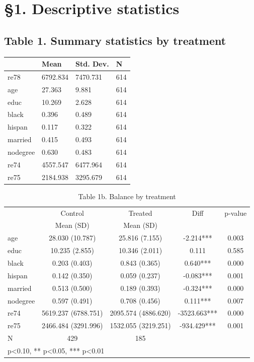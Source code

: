 \section{§1. Descriptive statistics}

\subsection*{Table 1. Summary statistics by treatment}
\begin{tabular}{llll}
\toprule
 & Mean & Std. Dev. & N \\
\midrule
re78 & 6792.834 & 7470.731 & 614 \\
age & 27.363 & 9.881 & 614 \\
educ & 10.269 & 2.628 & 614 \\
black & 0.396 & 0.489 & 614 \\
hispan & 0.117 & 0.322 & 614 \\
married & 0.415 & 0.493 & 614 \\
nodegree & 0.630 & 0.483 & 614 \\
re74 & 4557.547 & 6477.964 & 614 \\
re75 & 2184.938 & 3295.679 & 614 \\
\bottomrule
\end{tabular}


\begin{table}[htbp]
\centering
\caption{Table 1b. Balance by treatment}
\begin{tabular}{lcccc}
\hline\hline
 & Control & Treated & Diff & p-value \\
 & Mean (SD) & Mean (SD) & & \\
\hline
age & 28.030 (10.787) & 25.816 (7.155) & -2.214*** & 0.003 \\
educ & 10.235 (2.855) & 10.346 (2.011) & 0.111 & 0.585 \\
black & 0.203 (0.403) & 0.843 (0.365) & 0.640*** & 0.000 \\
hispan & 0.142 (0.350) & 0.059 (0.237) & -0.083*** & 0.001 \\
married & 0.513 (0.500) & 0.189 (0.393) & -0.324*** & 0.000 \\
nodegree & 0.597 (0.491) & 0.708 (0.456) & 0.111*** & 0.007 \\
re74 & 5619.237 (6788.751) & 2095.574 (4886.620) & -3523.663*** & 0.000 \\
re75 & 2466.484 (3291.996) & 1532.055 (3219.251) & -934.429*** & 0.001 \\
\hline
N & 429 & 185 & & \\
\hline\hline
\multicolumn{5}{l}{\footnotesize * p<0.10, ** p<0.05, *** p<0.01} \\
\end{tabular}
\end{table}

